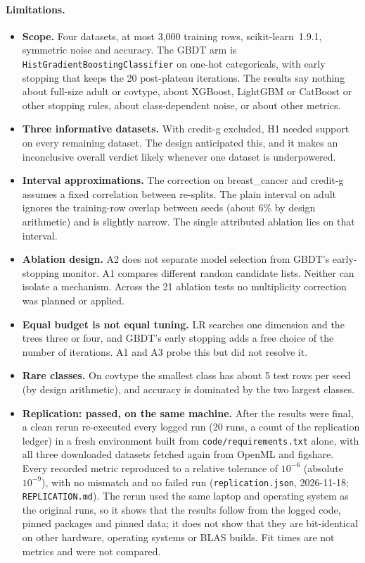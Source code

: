 \documentclass[11pt]{article}
\newcommand{\ds}[1]{\textsf{#1}}
\newcommand{\bc}{\ds{breast\_cancer}}
\newcommand{\cg}{\ds{credit-g}}
\newcommand{\ad}{\ds{adult}}
\newcommand{\ct}{\ds{covtype}}
\begin{document}
\paragraph{Limitations.}
\begin{itemize}
  \item \textbf{Scope.} Four datasets, at most 3,000 training rows, scikit-learn~1.9.1,
  symmetric noise and accuracy. The GBDT arm is \texttt{HistGradientBoostingClassifier} on
  one-hot categoricals, with early stopping that keeps the 20 post-plateau iterations. The
  results say nothing about full-size \ad{} or \ct, about XGBoost, LightGBM or CatBoost or
  other stopping rules, about class-dependent noise, or about other metrics.
  \item \textbf{Three informative datasets.} With \cg{} excluded, H1 needed support on every
  remaining dataset. The design anticipated this, and it makes an inconclusive overall
  verdict likely whenever one dataset is underpowered.
  \item \textbf{Interval approximations.} The correction on \bc{} and \cg{} assumes a fixed
  correlation between re-splits. The plain interval on \ad{} ignores the training-row
  overlap between seeds (about 6\% by design arithmetic) and is slightly narrow. The single attributed ablation lies on that
  interval.
  \item \textbf{Ablation design.} A2 does not separate model selection from GBDT's
  early-stopping monitor. A1 compares different random candidate lists. Neither can isolate
  a mechanism. Across the 21 ablation tests no multiplicity correction was planned or
  applied.
  \item \textbf{Equal budget is not equal tuning.} LR searches one dimension and the trees
  three or four, and GBDT's early stopping adds a free choice of the number of iterations.
  A1 and A3 probe this but did not resolve it.
  \item \textbf{Rare classes.} On \ct{} the smallest class has about 5 test rows per seed (by
  design arithmetic),
  and accuracy is dominated by the two largest classes.
  \item \textbf{Replication: passed, on the same machine.} After the results were final, a
  clean rerun re-executed every logged run (20 runs, a count of the replication ledger) in a
  fresh environment built from \texttt{code/requirements.txt} alone, with all three
  downloaded datasets fetched again from OpenML and figshare. Every recorded metric
  reproduced to a relative tolerance of $10^{-6}$ (absolute $10^{-9}$), with no mismatch
  and no failed run (\texttt{replication.json}, 2026-11-18; \texttt{REPLICATION.md}). The
  rerun used the same laptop and operating system as the original runs, so it shows that
  the results follow from the logged code, pinned packages and pinned data; it does not
  show that they are bit-identical on other hardware, operating systems or BLAS builds.
  Fit times are not metrics and were not compared.
\end{itemize}
\end{document}
